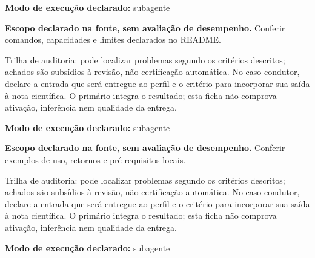 \begin{arquitetura}
\textbf{Modo de execução declarado:} subagente
\end{arquitetura}


\begin{descricao}
\textbf{Escopo declarado na fonte, sem avaliação de desempenho.}
Conferir comandos, capacidades e limites declarados no README.
\end{descricao}

\begin{funcao}
Trilha de auditoria: pode localizar problemas segundo os critérios descritos; achados são subsídios à revisão, não certificação automática. No caso condutor, declare a entrada que será entregue ao perfil e o critério para incorporar sua saída à nota científica. O primário integra o resultado; esta ficha não comprova ativação, inferência nem qualidade da entrega.
\end{funcao}

\begin{arquitetura}
\textbf{Modo de execução declarado:} subagente
\end{arquitetura}


\begin{descricao}
\textbf{Escopo declarado na fonte, sem avaliação de desempenho.}
Conferir exemplos de uso, retornos e pré-requisitos locais.
\end{descricao}

\begin{funcao}
Trilha de auditoria: pode localizar problemas segundo os critérios descritos; achados são subsídios à revisão, não certificação automática. No caso condutor, declare a entrada que será entregue ao perfil e o critério para incorporar sua saída à nota científica. O primário integra o resultado; esta ficha não comprova ativação, inferência nem qualidade da entrega.
\end{funcao}

\begin{arquitetura}
\textbf{Modo de execução declarado:} subagente
\end{arquitetura}

